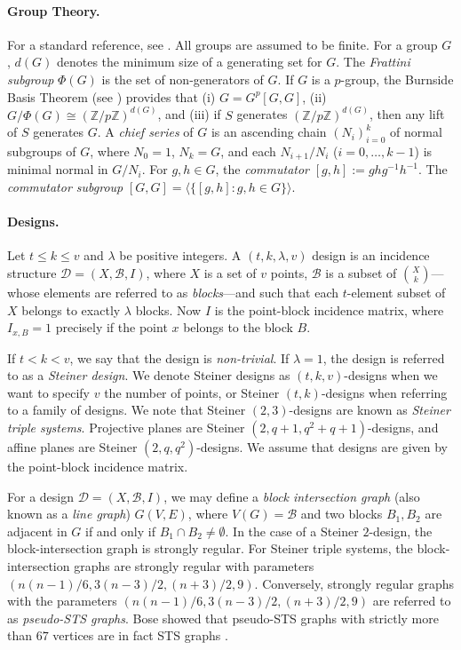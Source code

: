 \documentclass{theoretics}
\begin{document}
\paragraph{Group Theory.} For a standard reference, see \cite{Robinson1982}. All groups are assumed to be finite. For a group $G$, $d(G)$ denotes the minimum size of a generating set for $G$. The \textit{Frattini subgroup} $\Phi(G)$ is the set of non-generators of $G$. If $G$ is a $p$-group, the Burnside Basis Theorem (see \cite[Theorem 5.3.2]{Robinson1982}) provides that (i) $G = G^{p}[G,G]$, (ii) $G/\Phi(G) \cong (\mathbb{Z}/p\mathbb{Z})^{d(G)}$, and (iii) if $S$ generates $(\mathbb{Z}/p\mathbb{Z})^{d(G)}$, then any lift of $S$ generates $G$. A \textit{chief series} of $G$ is an ascending chain $(N_{i})_{i=0}^{k}$ of normal subgroups of $G$, where $N_{0} = 1$, $N_{k} = G$, and each $N_{i+1}/N_{i}$ ($i = 0, \ldots, k-1$) is minimal normal in $G/N_{i}$. 
For $g, h \in G$, the \textit{commutator} $[g,h] := ghg^{-1}h^{-1}$. The \textit{commutator subgroup} $[G,G] = \langle \{ [g,h] : g,h \in G \} \rangle$.

\paragraph{Designs.} Let $t \leq k \leq v$ and $\lambda$ be positive integers. A $(t, k, \lambda, v)$ design is an incidence structure $\mathcal{D} = (X, \mathcal{B}, I)$, where $X$ is a set of $v$ points, $\mathcal{B}$ is a subset of $\binom{X}{k}$---whose elements are referred to as \textit{blocks}---and such that each $t$-element subset of $X$ belongs to exactly $\lambda$ blocks. Now $I$ is the point-block incidence matrix, where $I_{x,B} = 1$ precisely if the point $x$ belongs to the block $B$.

If $t < k < v$, we say that the design is \textit{non-trivial}. If $\lambda = 1$, the design is referred to as a \textit{Steiner design}. We denote Steiner designs as $(t, k, v)$-designs when we want to specify $v$ the number of points, or Steiner $(t, k)$-designs when referring to a family of designs. We note that Steiner $(2, 3)$-designs are known as \textit{Steiner triple systems}. Projective planes are Steiner $(2, q+1, q^{2} + q + 1)$-designs, and affine planes are Steiner $(2, q, q^{2})$-designs. We assume that designs are given by the point-block incidence matrix. 


For a design $\mathcal{D} = (X, \mathcal{B}, I)$, we may define a \textit{block intersection graph} (also known as a \textit{line graph}) $G(V, E)$, where $V(G) = \mathcal{B}$ and two blocks $B_{1}, B_{2}$ are adjacent in $G$ if and only if $B_{1} \cap B_{2} \neq \emptyset$. In the case of a Steiner $2$-design, the block-intersection graph is strongly regular. For Steiner triple systems, the block-intersection graphs are strongly regular with parameters $(n(n-1)/6, 3(n-3)/2, (n+3)/2, 9)$. Conversely, strongly regular graphs with the parameters $(n(n-1)/6, 3(n-3)/2, (n+3)/2, 9)$ are referred to as \textit{pseudo-STS graphs}. Bose showed that pseudo-STS graphs with strictly more than $67$ vertices are in fact STS graphs \cite{Bose}. 
\end{document}
